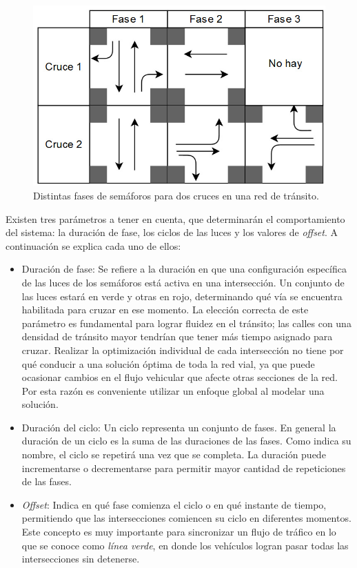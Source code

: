 \begin{figure}
	\centering
	\includegraphics[width=0.8\linewidth]{Figures/fases1}
	\caption{Distintas fases de semáforos para dos cruces en una red de tránsito.}
	\label{fig:fases}
\end{figure}

Existen tres parámetros a tener en cuenta, que determinarán el comportamiento del sistema: la duración de fase, los ciclos de las luces y los valores de \emph{offset}. 
A continuación se explica cada uno de ellos:


\begin{itemize}
 	\item Duración de fase: Se refiere a la duración en que una configuración específica de las luces de los semáforos está activa en una intersección. Un conjunto de las luces estará en verde y otras en rojo, determinando qué vía se encuentra habilitada para cruzar en ese momento. La elección correcta de este parámetro es fundamental para lograr fluidez en el tránsito; las calles con una densidad de tránsito mayor tendrían que tener más tiempo asignado para cruzar. Realizar la optimización individual de cada intersección no tiene por qué conducir a una solución óptima de toda la red vial, ya que puede ocasionar cambios en el flujo vehicular que afecte otras secciones de la red. Por esta razón es conveniente utilizar un enfoque global al modelar una solución.
 	
 	\item Duración del ciclo: Un ciclo representa un conjunto de fases. En general la duración de un ciclo es la suma de las duraciones de las fases. Como indica su nombre, el ciclo se repetirá una vez que se completa. La duración puede incrementarse o decrementarse para permitir mayor cantidad de repeticiones de las fases.
 	
 	\item \emph{Offset}: Indica en qué fase comienza el ciclo o en qué instante de tiempo, permitiendo que las intersecciones comiencen su ciclo en diferentes momentos. Este concepto es muy importante para sincronizar un flujo de tráfico en lo que se conoce como \emph{línea verde}, en donde los vehículos logran pasar todas las intersecciones sin detenerse.
\end{itemize}

